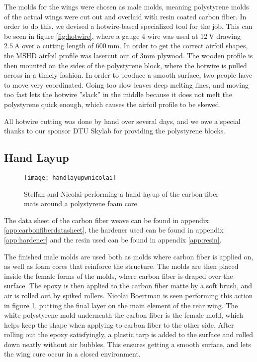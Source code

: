   The molds for the wings were chosen as male molds, meaning polystyrene molds of the actual wings were cut out and overlaid with resin coated carbon fiber. In order to do this, we devised a hotwire-based specialized tool for the job. This can be seen in figure \ref{fig:hotwire}, where a gauge 4 wire was used at $\SI{12}{\volt}$ drawing $\SI{2.5}{\ampere}$ over a cutting length of $\SI{600}{\milli\metre}$. In order to get the correct airfoil shapes, the MSHD airfoil profile was lasercut out of 3mm plywood. The wooden profile is then mounted on the sides of the polystyrene block, where the hotwire is pulled across in a timely fashion. In order to produce a smooth surface, two people have to move very coordinated. Going too slow leaves deep melting lines, and moving too fast lets the hotwire ''slack'' in the middle because it does not melt the polystyrene quick enough, which causes the airfoil profile to be skewed.

  All hotwire cutting was done by hand over several days, and we owe a special thanks to our sponsor DTU Skylab for providing the polystyrene blocks.

  \subsection{Hand Layup}

    \begin{figure}
      \texttt{[image: handlayupwnicolai]}
      \caption{Steffan and Nicolai performing a hand layup of the carbon fiber mats around a polystyrene foam core.}
      \label{fig:handlayup}
    \end{figure}

    The data sheet of the carbon fiber weave can be found in appendix \ref{app:carbonfiberdatasheet}, the hardener used can be found in appendix \ref{app:hardener} and the resin used can be found in appendix \ref{app:resin}.

    The finished male molds are used both as molds where carbon fiber is applied on, as well as foam cores that reinforce the structure. The molds are then placed inside the female forms of the molds, where carbon fiber is draped over the surface. The epoxy is then applied to the carbon fiber matte by a soft brush, and air is rolled out by spiked rollers. Nicolai Boertman is seen performing this action in figure \ref{fig:handlayup}, putting the final layer on the main element of the rear wing. The white polystyrene mold underneath the carbon fiber is the female mold, which helps keep the shape when applying to carbon fiber to the other side. After rolling out the epoxy satisfyingly, a plastic tarp is added to the surface and rolled down neatly without air bubbles. This ensures getting a smooth surface, and lets the wing cure occur in a closed environment.

